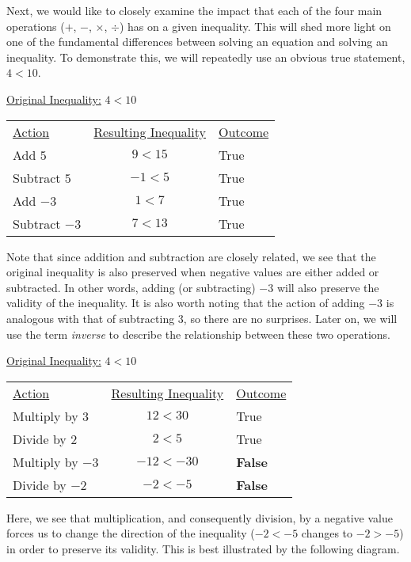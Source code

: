 \documentclass[12pt]{book}
\theoremstyle{definition}
\begin{document}
Next, we would like to closely examine the impact that each of the four main operations ($+$, $-$, $\times$, $\div$) has on a given inequality.  This will shed more light on one of the fundamental differences between solving an equation and solving an inequality.  To demonstrate this, we will repeatedly use an obvious true statement, $4<10$.\par
\underline{Original Inequality:} $4<10$
\begin{center}
\begin{tabular}{lcl}
\underline{Action} & \underline{Resulting Inequality} & \underline{Outcome}\\
Add $5$ & $9<15$ & True\\
Subtract $5$ & $-1<5$ & True\\
Add $-3$ & $1<7$ & True\\
Subtract $-3$ & $7<13$ & True\\
\end{tabular}
\end{center}
Note that since addition and subtraction are closely related, we see that the original inequality is also preserved when negative values are either added or subtracted.  In other words, adding (or subtracting) $-3$ will also preserve the validity of the inequality.  It is also worth noting that the action of adding $-3$ is analogous with that of subtracting $3$, so there are no surprises.  Later on, we will use the term {\it inverse} to describe the relationship between these two operations.\par
\underline{Original Inequality:} $4<10$
\begin{center}
\begin{tabular}{lcl}
\underline{Action} & \underline{Resulting Inequality} & \underline{Outcome}\\
Multiply by $3$ & $12<30$ & True\\
Divide by $2$ & $2<5$ & True\\
Multiply by $-3$ & $-12<-30$ & {\bf False}\\
Divide by $-2$ & $-2<-5$ & {\bf False}\\
\end{tabular}
\end{center}
Here, we see that multiplication, and consequently division, by a negative value forces us to change the direction of the inequality ($-2<-5$ changes to $-2>-5$) in order to preserve its validity.  This is best illustrated by the following diagram.
\end{document}
